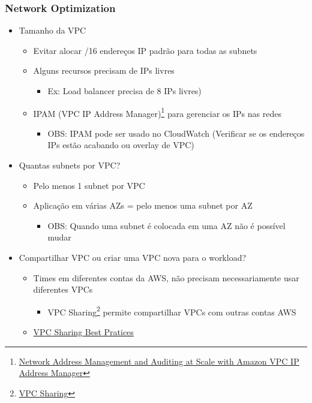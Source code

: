 \begin{frame}[allowframebreaks]
	\frametitle{Network Optimization}
	\begin{itemize}
		\item Tamanho da VPC
			\begin{itemize}
				\item Evitar alocar /16 endereços IP padrão para todas as subnets
				\item Alguns recursos precisam de IPs livres 
					\begin{itemize}
						\item Ex: Load balancer precisa de 8 IPs livres)
					\end{itemize}
				\item IPAM (VPC IP Address Manager)\footnote{\href{https://aws.amazon.com/blogs/aws/network-address-management-and-auditing-at-scale-with-amazon-vpc-ip-address-manager/}{Network Address Management and Auditing at Scale with Amazon VPC IP Address Manager}} para gerenciar os IPs nas redes
					\begin{itemize}
						\item OBS: IPAM pode ser usado no CloudWatch (Verificar se os endereços IPs estão acabando ou overlay de VPC)
					\end{itemize}
			\end{itemize}
		\framebreak
		\item Quantas subnets por VPC?
			\begin{itemize}
				\item Pelo menos 1 subnet por VPC
				\item Aplicação em várias AZs = pelo menos uma subnet por AZ
					\begin{itemize}
						\item OBS: Quando uma subnet é colocada em uma AZ não é possível mudar
					\end{itemize}
			\end{itemize}
		\item Compartilhar VPC ou criar uma VPC nova para o workload?
			\begin{itemize}
				\item Times em diferentes contas da AWS, não precisam necessariamente usar diferentes VPCs
					\begin{itemize}
						\item VPC Sharing\footnote{\href{https://aws.amazon.com/blogs/networking-and-content-delivery/vpc-sharing-a-new-approach-to-multiple-accounts-and-vpc-management/}{VPC Sharing}} permite compartilhar VPCs com outras contas AWS
					\end{itemize}
				\item \href{https://aws.amazon.com/blogs/networking-and-content-delivery/vpc-sharing-key-considerations-and-best-practices/}{VPC Sharing Best Pratices}
			\end{itemize}
	\end{itemize}
\end{frame}
